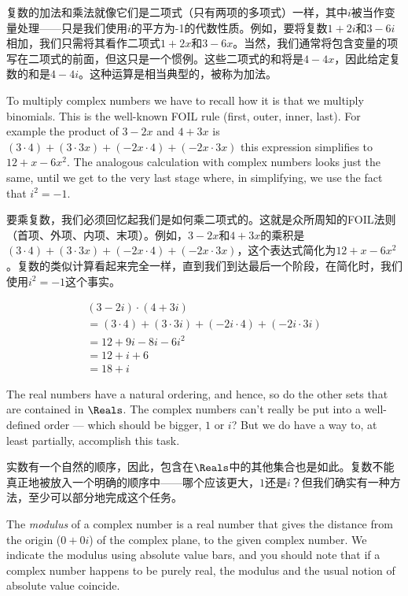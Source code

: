 复数的加法和乘法就像它们是二项式（只有两项的多项式）一样，其中$i$被当作变量处理——只是我们使用$i$的平方为-1的代数性质。例如，要将复数$1+2i$和$3-6i$相加，我们只需将其看作二项式$1+2x$和$3-6x$。当然，我们通常将包含变量的项写在二项式的前面，但这只是一个惯例。这些二项式的和将是$4-4x$，因此给定复数的和是$4-4i$。这种运算是相当典型的，被称为加法。

To multiply complex numbers we have to
recall how it is that we multiply binomials. This is the well-known
FOIL rule (first, outer, inner, last).  For example the product of
$3-2x$ and $4+3x$ is $(3\cdot 4) + (3 \cdot 3x) + (-2x\cdot 4) +
(-2x\cdot 3x)$ this expression simplifies to $12 + x - 6x^2$. The
analogous calculation with complex numbers looks just the same, until
we get to the very last stage where, in simplifying, we use the fact
that $i^2=-1$.

要乘复数，我们必须回忆起我们是如何乘二项式的。这就是众所周知的FOIL法则（首项、外项、内项、末项）。例如，$3-2x$和$4+3x$的乘积是$(3\cdot 4) + (3 \cdot 3x) + (-2x\cdot 4) + (-2x\cdot 3x)$，这个表达式简化为$12 + x - 6x^2$。复数的类似计算看起来完全一样，直到我们到达最后一个阶段，在简化时，我们使用$i^2=-1$这个事实。

\begin{gather*}
 (3-2i)\cdot (4+3i) \\
= (3\cdot 4) + (3\cdot 3i) + (-2i\cdot 4) + (-2i\cdot 3i) \\
= 12 + 9i - 8i -6i^2 \\
= 12 + i + 6 \\
= 18 + i 
\end{gather*}


The real numbers have a natural ordering, and hence, so do the 
other sets that are contained in $\Reals$. The complex numbers 
can't really be put into a well-defined order --- which should be
bigger, $1$  or $i$? But we do have a way to, at least partially, 
accomplish this task.

实数有一个自然的顺序，因此，包含在$\Reals$中的其他集合也是如此。复数不能真正地被放入一个明确的顺序中——哪个应该更大，$1$还是$i$？但我们确实有一种方法，至少可以部分地完成这个任务。

The 
\emph{modulus} of a complex number is a real number that gives the
distance from the origin ($0+0i$) of the complex plane, to the given
complex number. We indicate the modulus using absolute value bars,
and you should note that if a complex number happens to be purely
real, the modulus and the usual notion of absolute value coincide.

